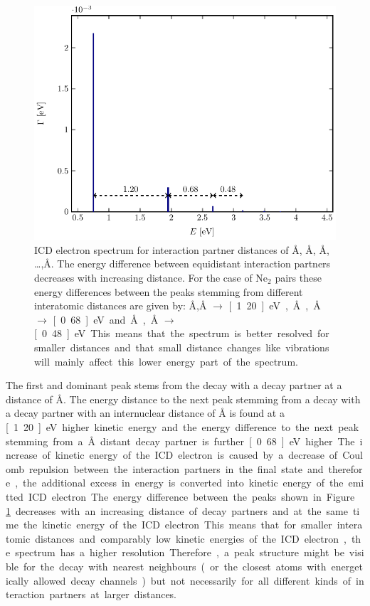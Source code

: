 \begin{figure}[h]
 \centering
 \includegraphics[width=\columnwidth]{pics/model_EGamma.pdf}
 \caption{ICD electron spectrum for interaction partner distances of
          \unit[3]{\AA}, \unit[4]{\AA}, \unit[5]{\AA}, \dots ,\unit[9]{\AA}.
          The energy difference between equidistant interaction partners
          decreases with increasing distance. For the case of Ne$_2$ pairs
          these energy differences between the peaks stemming from different
          interatomic distances are given by:
          \unit[3]{\AA},\unit[4]{\AA} $\rightarrow$ \unit[1.20]{eV},
          \unit[4]{\AA},\unit[5]{\AA} $\rightarrow$ \unit[0.68]{eV} and
          \unit[5]{\AA},\unit[6]{\AA} $\rightarrow$ \unit[0.48]{eV}.
          This means that the spectrum is better resolved for smaller distances
          and that small distance changes like vibrations will mainly affect
          this lower energy part of the spectrum.
}
 \label{figure:model_EGamma}
\end{figure}

The first and dominant peak stems from the decay with a decay
partner at a distance of \unit[3]{\AA}. The energy distance to the next peak
stemming from a decay with a decay partner with an internuclear distance of
\unit[4]{\AA} is found at a \unit[1.20]{eV} higher kinetic energy and the
energy difference to the next peak stemming from a \unit[5]{\AA} distant
decay partner is further \unit[0.68]{eV} higher. The increase of kinetic
energy of the ICD electron is caused by a decrease of Coulomb repulsion between
the interaction partners in the final state and therefore, the additional
excess in energy is converted into kinetic energy of the emitted ICD electron.
The energy difference between the peaks shown in Figure \ref{figure:model_EGamma}
decreases with an increasing distance of decay partners and at the same time
the kinetic energy
of the ICD electron. This means that for smaller interatomic distances and
comparably low kinetic energies of the ICD electron, the spectrum has a higher
resolution.
Therefore, a peak structure might be visible for the decay with nearest
neighbours (or the closest atoms with energetically allowed decay channels)
but not necessarily for all different kinds of interaction partners at larger
distances.

